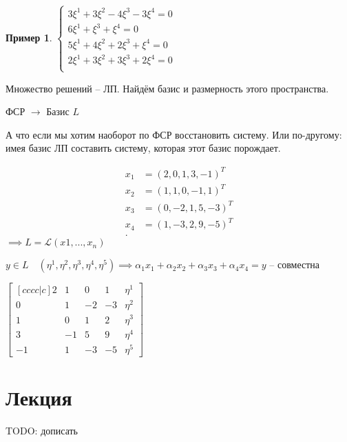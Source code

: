 \documentclass{book}
\theoremstyle{definition}
\newtheorem*{example}{Пример}
\begin{document}
\begin{example}
    $\begin{cases}
        3\xi^{1} + 3\xi^2  -4\xi^3 - 3\xi^4 = 0\\
        6\xi^1 + \xi^3 + \xi^4 = 0\\
        5\xi^1 + 4\xi^2 + 2\xi^3 + \xi^4 = 0\\
        2\xi^1 + 3\xi^2 + 3\xi^3 + 2\xi^4 = 0\\
    \end{cases}$

    Множество решений -- ЛП. Найдём базис и размерность этого пространства.

    ФСР $\to $ Базис $L$

    А что если мы хотим наоборот по ФСР восстановить систему. Или по-другому: имея базис ЛП составить систему, которая этот базис порождает.


    \begin{align*}
        x_1&= \left(2,0,1,3,-1 \right)^T  \\
        x_2&= \left( 1,1,0,-1,1 \right)^T  \\
        x_3&= \left( 0,-2,1,5,-3 \right)^T  \\
        x_4&= \left( 1,-3,2,9,-5\right)^T  \\
    .\end{align*} $\implies  L = \mathscr{L}(x1, ..., x_n)$

    $y\in L\quad \left( \eta^1, \eta^2, \eta^3, \eta^4, \eta^5 \right) \implies  \alpha_1x_1 + \alpha_2x_2 + \alpha_3x_3 + \alpha_4x_4 = y$ -- совместна

    $\begin{bmatrix} [c c c c|c ] 2&1&0&1&\eta^1\\ 0&1&-2&-3&\eta^2 \\ 1&0&1&2&\eta^3\\ 3&-1&5&9&\eta^4\\ -1&1&-3&-5&\eta^5 \end{bmatrix} $


\end{example}


\section{Лекция}
TODO: дописать
\end{document}
